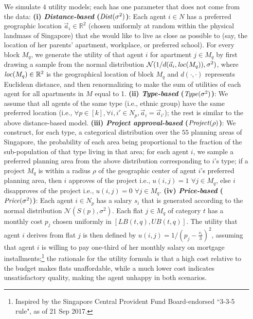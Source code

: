 \documentclass[11pt,dvipdfmx]{article}
\newcommand{\R}{\mathbb{R}}
\begin{document}
We simulate $4$ utility models; each has one parameter that does not come from the data: \textbf{(i) {\em Distance-based} ($\operatorname{\mathit{Dist}}(\sigma^2)$)}: Each agent $i \in N$ has a preferred geographic location $\vec a_i \in \R^2$ (chosen uniformly at random within the physical landmass of Singapore) that she would like to live as close as possible to (say, the location of her parents' apartment, workplace, or preferred school). For every block $M_q$, we generate the utility of that agent $i$ for apartment $j \in M_q$ by first drawing a sample from the normal distribution $\mathcal{N}(1/ d(\vec a_i,\operatorname{\mathit{loc}}(M_q)),\sigma^2)$, where $\loc(M_q) \in \R^2$ is the geographical location of block $M_q$ and $d(\cdot,\cdot)$ represents Euclidean distance, and then renormalizing to make the sum of utilities of each agent for all apartments in $M$ equal to 1. \textbf{(ii) {\em Type-based} ($\operatorname{\mathit{Type}}(\sigma^2)$)}: We assume that all agents of the same type (i.e., ethnic group) have the same preferred location (i.e.,  $\forall p \in [k], \forall i,i' \in N_p, \vec a_i = \vec a_{i'}$); the rest is similar to the above distance-based model. \textbf{(iii) {\em Project approval-based} ($\operatorname{\mathit{Project}}(\rho)$)}: We construct, for each type, a categorical distribution over the $55$ planning areas of Singapore, the probability of each area being proportional to the fraction of the sub-population of that type living in that area; for each agent $i$, we sample a preferred planning area from the above distribution corresponding to $i$'s type; if a project $M_q$ is within a radius $\rho$ of the geographic center of agent $i$'s preferred planning area, then $i$ approves of the project i.e., $u(i,j) = 1$ $\forall j \in M_q$, else $i$ disapproves of the project i.e., $u(i,j) = 0$ $\forall j \in M_q$. \textbf{(iv) {\em Price-based} ($\operatorname{\mathit{Price}}(\sigma^2)$)}: Each agent $i \in N_p$ has a salary $s_i$ that is generated according to the normal distribution $\mathcal{N}(S(p),\sigma^2)$. Each flat $j \in M_q$ of category $t$ has a monthly cost $p_j$ chosen uniformly in $[\mathit{LB}(t,q), \mathit{UB}(t,q)]$. 
The utility that agent $i$ derives from flat $j$ is then defined by $u(i,j)= 1/(p_j - \frac{s_i}{3})^2$, assuming that agent $i$ is willing to pay one-third of her monthly salary on mortgage installments;\footnote{Inspired by the Singapore Central Provident Fund Board-endorsed ``3-3-5 rule", as of 21 Sep 2017.} the rationale for the utility formula is that a high cost relative to the budget makes flats unaffordable, while a much lower cost indicates unsatisfactory quality, making the agent unhappy in both scenarios. 
\end{document}
